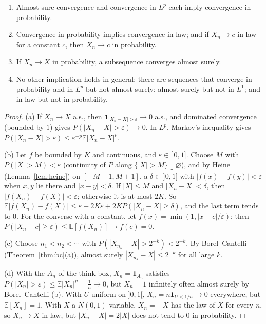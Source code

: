 \begin{proposition}\label{prop:modes}
\begin{enumerate}[label=(\alph*)]
\item Almost sure convergence and convergence in $L^p$ each imply convergence in probability.
\item Convergence in probability implies convergence in law; and if $X_n\to c$ in law for a constant $c$, then $X_n\to c$ in
probability.
\item If $X_n\to X$ in probability, a subsequence converges almost surely.
\item No other implication holds in general: there are sequences that converge in probability and in $L^p$ but not almost
surely; almost surely but not in $L^1$; and in law but not in probability.
\end{enumerate}
\end{proposition}
\begin{proof}
(a) If $X_n\to X$ a.s., then $\mathbf 1_{|X_n-X|>\varepsilon}\to0$ a.s., and dominated convergence (bounded by $1$) gives $P(|X_n-X|>\varepsilon)\to0$. In $L^p$,
Markov's inequality gives $P(|X_n-X|>\varepsilon)\le\varepsilon^{-p}\mathbb E|X_n-X|^p$.

(b) Let $f$ be bounded by $K$ and continuous, and $\varepsilon\in\,]0,1]$. Choose $M$ with $P(|X|>M)<\varepsilon$ (continuity of $P$ along $\{|X|>M\}\downarrow\varnothing$), and
by Heine (Lemma~\ref{lem:heine}) on $[-M-1,M+1]$, a $\delta\in\,]0,1]$ with $|f(x)-f(y)|<\varepsilon$ when $x,y$ lie there and $|x-y|<\delta$. If $|X|\le M$ and
$|X_n-X|<\delta$, then $|f(X_n)-f(X)|<\varepsilon$; otherwise it is at most $2K$. So $\mathbb E|f(X_n)-f(X)|\le\varepsilon+2K\varepsilon+2KP(|X_n-X|\ge\delta)$, and the last term
tends to $0$. For the converse with a constant, let $f(x)=\min(1,|x-c|/\varepsilon)$: then $P(|X_n-c|\ge\varepsilon)\le\mathbb E[f(X_n)]\to f(c)=0$.

(c) Choose $n_1<n_2<\cdots$ with $P(|X_{n_k}-X|>2^{-k})<2^{-k}$. By Borel--Cantelli (Theorem~\ref{thm:bc}(a)), almost surely $|X_{n_k}-X|\le2^{-k}$ for all
large $k$.

(d) With the $A_n$ of the think box, $X_n=\mathbf 1_{A_n}$ satisfies $P(|X_n|>\varepsilon)\le\mathbb E|X_n|^p=\frac1n\to0$, but $X_n=1$ infinitely often almost surely by
Borel--Cantelli (b). With $U$ uniform on $]0,1[$, $X_n=n\mathbf 1_{U<1/n}\to0$ everywhere, but $\mathbb E[X_n]=1$. With $X$ a $N(0,1)$ variable, $X_n=-X$ has
the law of $X$ for every $n$, so $X_n\to X$ in law, but $|X_n-X|=2|X|$ does not tend to $0$ in probability.
\end{proof}

